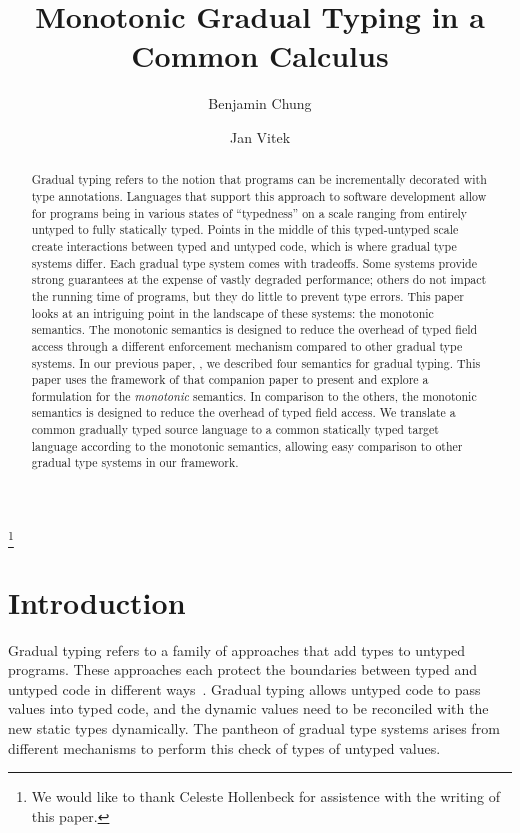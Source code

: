 \documentclass[sigconf]{acmart}
\begin{document}
\title{Monotonic Gradual Typing in a Common Calculus}
\subtitle{}

\author{Benjamin Chung}
\author{Jan Vitek}
\thanks{We would like to thank Celeste Hollenbeck for assistence with the writing of this paper.}


\begin{abstract} Gradual typing refers to the notion that programs can be
incrementally decorated with type annotations. Languages that support this
approach to software development allow for programs being in various states of
``typedness'' on a scale ranging from entirely untyped to fully statically
typed. Points in the middle of this typed-untyped scale create interactions
between typed and untyped code, which is where gradual type systems differ.
Each gradual type system comes with tradeoffs. Some systems provide strong
guarantees at the expense of vastly degraded performance; others do not impact
the running time of programs, but they do little to prevent type errors. This
paper looks at an intriguing point in the landscape of these systems: the
monotonic semantics. The monotonic semantics is designed to reduce the
overhead of typed field access through a different enforcement mechanism
compared to other gradual type systems. In our previous paper, \cite{us}, we
described four semantics for gradual typing. This paper uses the framework of
that companion paper to present and explore a formulation for the
\emph{monotonic} semantics.  In comparison to the others, the monotonic
semantics is designed to reduce the overhead of typed field access. We
translate a common gradually typed source language to a common statically
typed target language according to the monotonic semantics, allowing easy
comparison to other gradual type systems in our framework.  \end{abstract}



\maketitle

\section{Introduction}

Gradual typing refers to a family of approaches that add types to untyped
programs. These approaches each protect the boundaries between typed and untyped
code in different ways~\cite{SiekTaha06,tf-dls06}. Gradual typing allows
untyped code to pass values into typed code, and the dynamic values need to be
reconciled with the new static types dynamically. The pantheon of gradual type systems
arises from different mechanisms to perform this check of types of untyped values.
\end{document}
